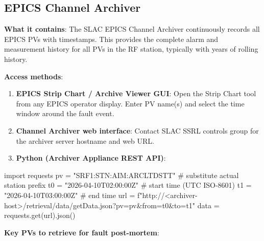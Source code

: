 \subsection{EPICS Channel Archiver}\label{sec:fd-archiver}


\textbf{What it contains}: The SLAC EPICS Channel Archiver continuously records all EPICS PVs with timestamps. This provides the complete alarm and measurement history for all PVs in the RF station, typically with years of rolling history.

\textbf{Access methods}:

\begin{enumerate}
\def\labelenumi{\arabic{enumi}.}
\item
  \textbf{EPICS Strip Chart / Archive Viewer GUI}: Open the Strip Chart tool from any EPICS operator display. Enter PV name(s) and select the time window around the fault event.
\item
  \textbf{Channel Archiver web interface}: Contact SLAC SSRL controls group for the archiver server hostname and web URL.
\item
  \textbf{Python (Archiver Appliance REST API)}:
\end{enumerate}

\begin{codeblock}
   import requests
   pv = "SRF1:STN:AIM:ARCLTDSTT"  # substitute actual station prefix
   t0 = "2026-04-10T02:00:00Z"      # start time (UTC ISO-8601)
   t1 = "2026-04-10T03:00:00Z"      # end time
   url = f"http://<archiver-host>/retrieval/data/getData.json?pv={pv}&from={t0}&to={t1}"
   data = requests.get(url).json()
\end{codeblock}

\textbf{Key PVs to retrieve for fault post-mortem}:

